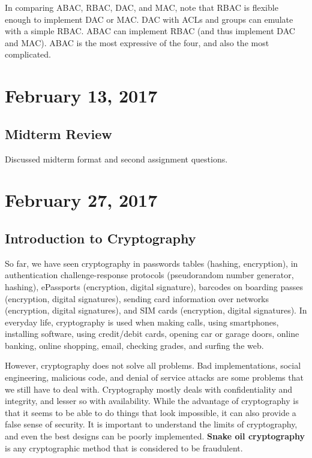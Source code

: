 \documentclass[11pt]{article}
\theoremstyle{plain} %
\theoremstyle{definition}
\theoremstyle{example}
\theoremstyle{remark}
\begin{document}
In comparing ABAC, RBAC, DAC, and MAC, note that RBAC is flexible enough to implement DAC or MAC. DAC with ACLs and groups can emulate with a simple RBAC. ABAC can implement RBAC (and thus implement DAC and MAC). ABAC is the most expressive of the four, and also the most complicated.



\section{February 13, 2017}
\subsection{Midterm Review}

Discussed midterm format and second assignment questions.




\section{February 27, 2017}
\subsection{Introduction to Cryptography}

So far, we have seen cryptography in passwords tables (hashing, encryption), in authentication challenge-response protocols (pseudorandom number generator, hashing), ePassports (encryption, digital signature), barcodes on boarding passes (encryption, digital signatures), sending card information over networks (encryption, digital signatures), and SIM cards (encryption, digital signatures). In everyday life, cryptography is used when making calls, using smartphones, installing software, using credit/debit cards, opening car or garage doors, online banking, online shopping, email, checking grades, and surfing the web. 

However, cryptography does not solve all problems. Bad implementations, social engineering, malicious code, and denial of service attacks are some problems that we still have to deal with. Cryptography mostly deals with confidentiality and integrity, and lesser so with availability. While the advantage of cryptography is that it seems to be able to do things that look impossible, it can also provide a false sense of security. It is important to understand the limits of cryptography, and even the best designs can be poorly implemented. \textbf{Snake oil cryptography} is any cryptographic method that is considered to be fraudulent. 
\end{document}
